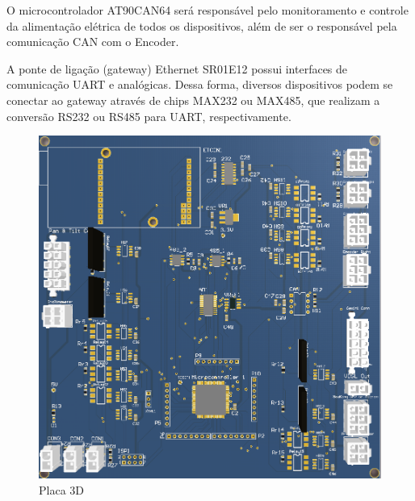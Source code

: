 O microcontrolador AT90CAN64 será responsável pelo monitoramento e controle da
alimentação elétrica de todos os dispositivos, além de ser o respon\-sável pela
comunicação CAN com o Encoder.

A ponte de ligação (gateway) Ethernet SR01E12 possui interfaces de comunicação
UART e analógicas. Des\-sa forma, diversos dispositivos podem se conectar ao
gateway atra\-vés de chips MAX232 ou MAX485, que realizam a conversão RS232 ou RS485 para UART, respectivamente.

\begin{figure}[H]
\centering
\includegraphics[width=1\columnwidth]{figs/eletronica/placav1.png}
\caption{Placa 3D}
\label{placa}
\end{figure}

